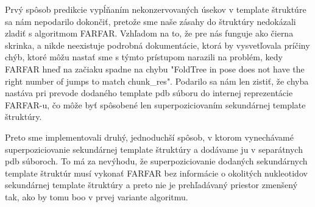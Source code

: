 \indent Prvý spôsob predikcie vypĺňaním nekonzervovaných úsekov v template štruktúre sa nám nepodarilo dokončiť, pretože sme naše zásahy do štruktúry nedokázali zladiť s algoritmom FARFAR. Vzhľadom na to, že pre nás funguje ako čierna skrinka, a nikde neexistuje podrobná dokumentácie, ktorá by vysvetľovala príčiny chýb, ktoré môžu nastať sme s týmto prístupom narazili na problém, kedy FARFAR hneď na začiaku spadne na chybu "FoldTree in pose does not have the right number of jumps to match chunk\_res". Podarilo sa nám len zistiť, že chyba nastáva pri prevode dodaného template pdb súboru do internej reprezentácie FARFAR-u, čo môže byť spôsobené len superpoziciovaním sekundárnej template štruktúry.


\indent Preto sme implementovali druhý, jednoduchší spôsob, v ktorom vynechávamé superpoziciovanie sekundárnej template štruktúry a dodávame ju v separátnych pdb súboroch. To má za nevýhodu, že superpoziciovanie dodaných sekundárnych template štruktúr musí vykonať FARFAR bez informácie o okolitých nukleotidov sekundárnej template štruktúry a preto nie je prehľadávaný priestor zmenšený tak, ako by tomu boo v prvej variante algoritmu.
